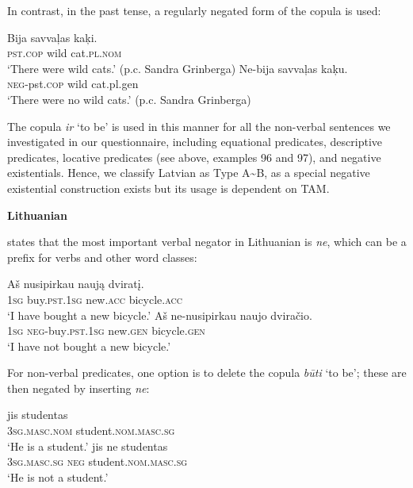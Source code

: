 ﻿\documentclass[output=paper]{langsci/langscibook}
\begin{document}
\begin{unindented}
In contrast, in the past tense, a regularly negated form of the copula is used:
%
\begin{exe}\ex \begin{xlist}
\ex\gll Bija savvaļas kaķi. \\
\textsc{pst.cop} wild cat.\textsc{pl.nom} \\
    \glt `There were wild cats.' (p.c. Sandra Grinberga)
\ex\gll Ne-bija savvaļas kaķu.\\
\textsc{neg}-pst.\textsc{cop} wild cat.pl.gen\\
\glt `There were no wild cats.' (p.c. Sandra Grinberga)
    \end{xlist}\end{exe}

The copula \textit{ir} `to be' is used in this manner for all the non-verbal sentences we investigated in our questionnaire, including equational predicates, descriptive predicates, locative predicates (see above, examples 96 and 97), and negative existentials. Hence, we classify Latvian as Type A{\textasciitilde}B, as a special negative existential construction exists but its usage is dependent on TAM. 

\textbf{Lithuanian}

\citet[176--177]{Mathiassen1996} states that the most important verbal negator in Lithuanian is \textit{ne}, which can be a prefix for verbs and other word classes:
%
\begin{exe}\ex \gll Aš nusipirkau naują dviratį. \\
\textsc{1sg} buy.\textsc{pst.1sg} new.\textsc{acc} bicycle.\textsc{acc} \\
    \glt `I have bought a new bicycle.' \citep[185]{Mathiassen1996}
\ex \gll Aš ne-nusipirkau naujo dviračio. \\
\textsc{1sg} \textsc{neg}-buy\textsc{.pst.1sg} new.\textsc{gen} bicycle.\textsc{gen} \\
    \glt `I have not bought a new bicycle.' \citep[185]{Mathiassen1996}
    \end{exe}

For non-verbal predicates, one option is to delete the copula \textit{būti} `to be'; these are then negated by inserting \textit{ne}:
%
\begin{exe}\ex \gll jis studentas \\
\textsc{3sg.masc.nom} student.\textsc{nom.masc.sg} \\
    \glt `He is a student.' \citep[176]{Mathiassen1996}
\ex \gll jis ne studentas \\
\textsc{3sg.masc.sg} \textsc{neg}  student.\textsc{nom.masc.sg} \\
    \glt `He is not a student.' \citep[176]{Mathiassen1996}
    \end{exe}


\end{unindented}
\end{document}
